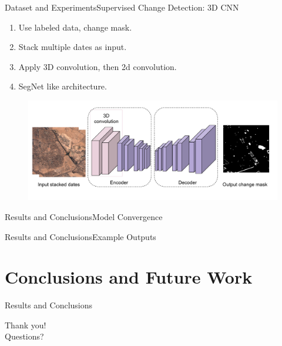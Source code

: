 \documentclass[handout]{beamer}
\begin{document}
\begin{frame}{Dataset and Experiments}{Supervised Change Detection: 3D CNN}
  \begin{enumerate}
      \item Use labeled data, change mask.
      \item Stack multiple dates as input.
      \item Apply 3D convolution, then 2d convolution.
      \item SegNet like architecture.
  \end{enumerate}
  \begin{center}
    \begin{figure}
    \includegraphics[scale=0.35]{images/3dconv_seg}
    \end{figure}
  \end{center}
\end{frame}


\begin{frame}{Results and Conclusions}{Model Convergence}

\end{frame}

\begin{frame}{Results and Conclusions}{Example Outputs}

\end{frame}

\section{Conclusions and Future Work}
\begin{frame}{Results and Conclusions}{}

\end{frame}

\begin{frame}
\center
\color{blue}
\huge{Thank you!}\\
\huge{Questions?}\\
\end{frame}
\end{document}
